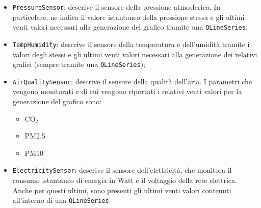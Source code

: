 \documentclass[a4paper, 12pt]{article}
\begin{document}
    \begin{itemize}
        \item \texttt{PressureSensor}: descrive il sensore della pressione atmosferica. In particolare, ne indica il valore istantaneo della pressione stessa e gli ultimi venti valori necessari alla generazione del grafico tramite una \texttt{QLineSeries};
        \item \texttt{TempHumidity}: descrive il sensore della temperatura e dell'umidità tramite i valori degli stessi e gli ultimi venti valori necessari alla generazione dei relativi grafici (sempre tramite una \texttt{QLineSeries});
        \item \texttt{AirQualitySensor}: descrive il sensore della qualità dell'aria. I parametri che vengono monitorati e di cui vengono riportati i relativi venti valori per la generazione del grafico sono:
        \begin{itemize}
            \item CO$_2$
            \item PM2.5
            \item PM10
        \end{itemize}
        \item \texttt{ElectricitySensor}: descrive il sensore dell'elettricità, che monitora il consumo istantaneo di energia in Watt e il voltaggio della rete elettrica. Anche per questi ultimi, sono presenti gli ultimi venti valori contenuti all'interno di una \texttt{QLineSeries}
    \end{itemize}
\end{document}
